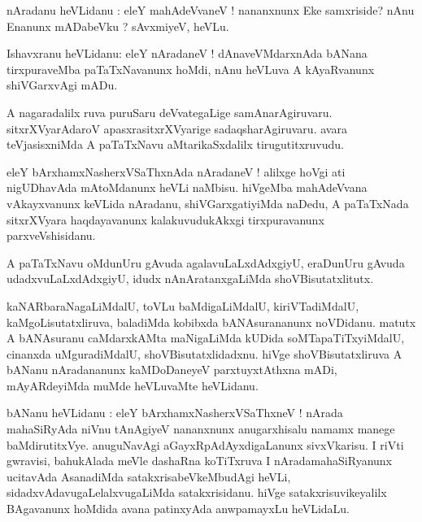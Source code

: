 \documentclass{article}
\begin{document}
\begin{mn}
nAradanu heVLidanu : eleY mahAdeVvaneV ! nananxnunx Eke samxriside? nAnu Enanunx mADabeVku ? 
sAvxmiyeV, heVLu. 
\end{mn}

\begin{mn}
Ishavxranu heVLidanu: eleY nAradaneV ! dAnaveVMdarxnAda bANana tirxpuraveMba paTaTxNavanunx 
hoMdi, nAnu heVLuva A kAyaRvanunx shiVGarxvAgi mADu.
\end{mn}

\begin{mn}
A nagaradalilx ruva puruSaru deVvategaLige samAnarAgiruvaru. sitxrXVyarAdaroV 
apasxrasitxrXVyarige sadaqsharAgiruvaru. avara teVjasisxniMda A paTaTxNavu aMtarikaSxdalilx
tirugutitxruvudu. 
\end{mn}

\begin{mn}
eleY bArxhamxNasherxVSaThxnAda nAradaneV !  alilxge hoVgi ati nigUDhavAda mAtoMdanunx heVLi 
naMbisu. hiVgeMba mahAdeVvana vAkayxvanunx  keVLida nAradanu, shiVGarxgatiyiMda naDedu, A 
paTaTxNada sitxrXVyara haqdayavanunx kalakuvudukAkxgi tirxpuravanunx parxveVshisidanu.
\end{mn}

\begin{mn}
A paTaTxNavu oMdunUru gAvuda agalavuLaLxdAdxgiyU, eraDunUru gAvuda udadxvuLaLxdAdxgiyU, idudx 
nAnAratanxgaLiMda shoVBisutatxlitutx.
\end{mn}

\begin{mn}
kaNARbaraNagaLiMdalU, toVLu baMdigaLiMdalU, kiriVTadiMdalU, kaMgoLisutatxliruva, 
baladiMda kobibxda bANAsurananunx noVDidanu. matutx A bANAsuranu caMdarxkAMta maNigaLiMda
kUDida soMTapaTiTxyiMdalU, cinanxda uMguradiMdalU, shoVBisutatxlidadxnu. hiVge shoVBisutatxliruva
A bANanu nAradananunx kaMDoDaneyeV parxtuyxtAthxna mADi, mAyARdeyiMda muMde heVLuvaMte heVLidanu.
\end{mn}

\begin{mn}
bANanu heVLidanu : eleY bArxhamxNasherxVSaThxneV ! nArada mahaSiRyAda niVnu tAnAgiyeV nananxnunx 
anugarxhisalu namamx manege baMdirutitxVye. anuguNavAgi aGayxRpAdAyxdigaLanunx sivxVkarisu. I riVti
gwravisi, bahukAlada meVle dashaRna koTiTxruva I nAradamahaSiRyanunx ucitavAda AsanadiMda 
satakxrisabeVkeMbudAgi heVLi, sidadxvAdavugaLelalxvugaLiMda satakxrisidanu. 
hiVge satakxrisuvikeyalilx BAgavanunx hoMdida avana patinxyAda anwpamayxLu heVLidaLu.
\end{mn}
\end{document}
